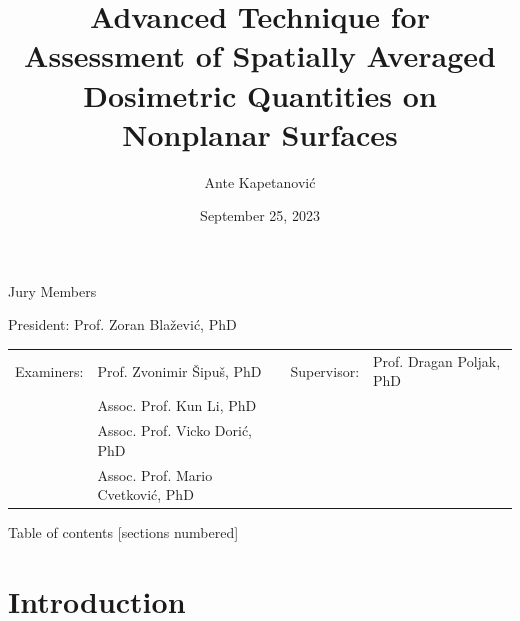 \documentclass[xcolor=dvipsnames,10pt]{beamer}
\title{Advanced Technique for Assessment of Spatially Averaged Dosimetric Quantities on Nonplanar Surfaces}
\author[Ante Kapetanović]{Ante Kapetanović}
\institute{Faculty of Electrical Engineering, Mechanical Engineering and Naval Architecture (FESB)}
\date{September 25, 2023}
\begin{document}
\begin{frame}[plain]
    \maketitle
    \begin{center}
        \scriptsize{%
            Jury Members\par
            President: Prof. Zoran Blažević, PhD\par\medskip
            \begin{table}
                \centering
                \begin{tabular}{llll}
                Examiners: & Prof. Zvonimir Šipuš, PhD & Supervisor: & Prof. Dragan Poljak, PhD \\
                 & Assoc. Prof. Kun Li, PhD &  &  \\
                 & Assoc. Prof. Vicko Dorić, PhD &  &  \\
                 & Assoc. Prof. Mario Cvetković, PhD &  & 
                \end{tabular}
            \end{table}
        }%
    \end{center}
\end{frame}

\begin{frame}{Table of contents}    
    [sections numbered]
        \tableofcontents
\end{frame}




\section[Introduction]{Introduction}
\end{document}
